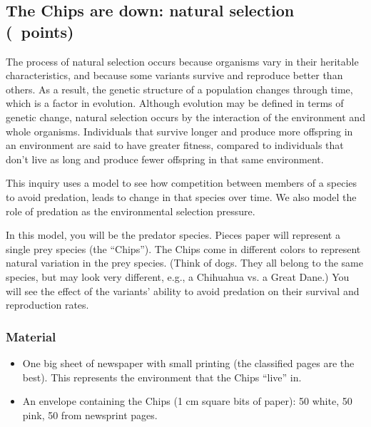 \documentclass[12pt, addpoints, hidelinks]{exam}
\begin{document}
\subsection*{The Chips are down: natural selection (\numpoints\ points)}

The process of natural selection occurs because organisms vary in their
heritable characteristics, and because some variants survive and
reproduce better than others. As a result, the genetic structure of a
population changes through time, which is a factor in evolution.
Although evolution may be defined in terms of genetic change, natural
selection occurs by the interaction of the environment and whole
organisms. Individuals that survive longer and produce more offspring in
an environment are said to have greater fitness, compared to individuals
that don't live as long and produce fewer offspring in that same
environment.

This inquiry uses a model to see how competition between members of a
species to avoid predation, leads to change in that species
over time. We also model the role of predation as the environmental
selection pressure.

In this model, you will be the predator species. Pieces
paper will represent a single prey species (the ``Chips''). The Chips come
in different colors to represent natural variation in the prey species.
(Think of dogs. They all belong to the same species, but may look very
different, e.g., a Chihuahua vs. a Great Dane.) You will see the effect
 of the variants' ability to avoid predation on their survival and reproduction rates.

\subsubsection*{Material}

\begin{itemize}
\item
  One big sheet of newspaper with small printing (the classified pages
  are the best). This represents the environment that the Chips ``live''
  in.
\item
  An envelope containing the Chips (1 cm square bits of paper):
  50 white, 50 pink, 50 from newsprint pages.
\end{itemize}

\vspace*{\baselineskip}
\end{document}
